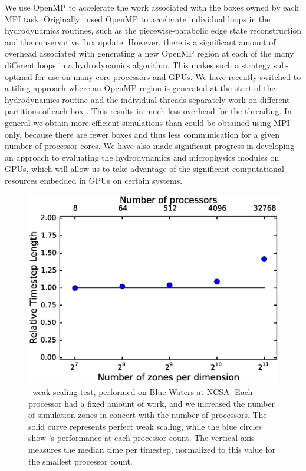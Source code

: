 \documentclass[12pt]{article}
\begin{document}
We use OpenMP to accelerate the work associated with the boxes owned
by each MPI task. Originally \castro\ used OpenMP to accelerate
individual loops in the hydrodynamics routines, such as the
piecewise-parabolic edge state reconstruction and the conservative
flux update. However, there is a significant amount of overhead
associated with generating a new OpenMP region at each of the many
different loops in a hydrodynamics algorithm. This makes such a
strategy sub-optimal for use on many-core processors and GPUs. We have
recently switched to a tiling approach where an OpenMP region is
generated at the start of the hydrodynamics routine and the individual
threads separately work on different partitions of each box \citep{boxlib-tiling}. This
results in much less overhead for the threading. In general we obtain
more efficient simulations than could be obtained using MPI only,
because there are fewer boxes and thus less communication for a given
number of processor cores. We have also made significant progress in
developing an approach to evaluating the hydrodynamics and microphysics modules on GPUs,
which will allow us to take advantage of the significant computational resources embedded in
GPUs on certain systems.

\begin{figure}
  \centering
  \includegraphics[scale=0.8]{plots/weak_scaling}
  \caption[\castro\ weak scaling test]
          {\castro\ weak scaling test, performed on Blue Waters at 
           NCSA. Each processor had a fixed amount of work, and we increased the 
           number of simulation zones in concert with the number of processors. The 
           solid curve represents perfect weak scaling, while the blue circles show 
           \castro's performance at each processor count. The vertical axis measures 
           the median time per timestep, normalized to this value for the smallest 
           processor count.
           \label{fig:weak_scaling}}
\end{figure}
\end{document}
